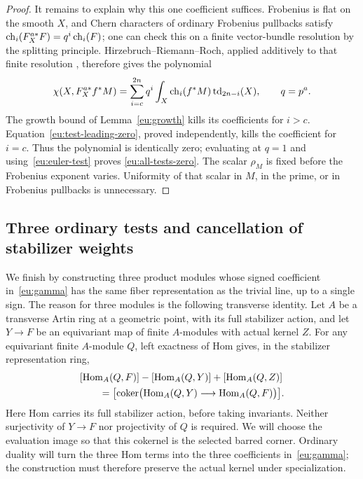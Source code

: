 \begin{proof}
It remains to explain why this one coefficient suffices.  Frobenius
is flat on the smooth $X$, and Chern characters of ordinary Frobenius
pullbacks satisfy $\operatorname{ch}_i(F_X^{a*}F)=q^i\operatorname{ch}_i(F)$; one can check this
on a finite vector-bundle resolution by the splitting principle.
Hirzebruch--Riemann--Roch, applied additively to that finite resolution
\cite[\S0.1]{BaumFultonMacPherson1975}, therefore gives the polynomial
\begin{equation}\label{eu:rr-polynomial}
 \chi(X,F_X^{a*}f^*M)=
 \sum_{i=c}^{2n}q^i
       \int_X\operatorname{ch}_i(f^*M)\operatorname{td}_{2n-i}(X),\qquad q=p^a.
\end{equation}
The growth bound of Lemma~\ref{eu:growth} kills its coefficients for
$i>c$.  Equation~\eqref{eu:test-leading-zero}, proved independently,
kills the coefficient for $i=c$.  Thus the polynomial is identically
zero; evaluating at $q=1$ and using~\eqref{eu:euler-test} proves
\eqref{eu:all-tests-zero}.  The scalar $\rho_M$ is fixed before the
Frobenius exponent varies.  Uniformity of that scalar in $M$, in the
prime, or in Frobenius pullbacks is unnecessary.
\end{proof}

\subsection{Three ordinary tests and cancellation of stabilizer weights}

We finish by constructing three product modules whose signed coefficient
in~\eqref{eu:gamma} has the same fiber representation as the trivial
line, up to a single sign.  The reason for three modules is the following
transverse identity.  Let $A$ be a transverse Artin ring at a geometric
point, with its full stabilizer action, and let $Y\to F$ be an equivariant
map of finite $A$-modules with actual kernel $Z$.  For any equivariant
finite $A$-module $Q$,
left exactness of Hom gives, in the stabilizer representation ring,
\begin{equation}\label{eu:hom-cokernel-template}
\begin{aligned}
 &[\operatorname{Hom}_A(Q,F)]-[\operatorname{Hom}_A(Q,Y)]+[\operatorname{Hom}_A(Q,Z)]\\
 &\hspace{2em}=\bigl[\operatorname{coker}\bigl(
       \operatorname{Hom}_A(Q,Y)\longrightarrow\operatorname{Hom}_A(Q,F)\bigr)\bigr].
\end{aligned}
\end{equation}
Here Hom carries its full stabilizer action, before taking invariants.
Neither surjectivity of $Y\to F$ nor projectivity of $Q$ is required.
We will choose the evaluation image so that this cokernel is the
selected barred corner.  Ordinary duality will turn the three Hom
terms into the three coefficients in~\eqref{eu:gamma}; the construction
must therefore preserve the actual kernel under specialization.

